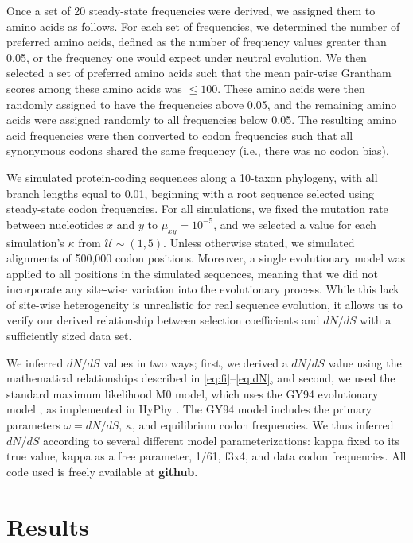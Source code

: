 \documentclass[11pt]{article}
\begin{document}
Once a set of 20 steady-state frequencies were derived, we assigned them to amino acids as follows. For each set of frequencies, we determined the number of preferred amino acids, defined as the number of frequency values greater than 0.05, or the frequency one would expect under neutral evolution.  We then selected a set of preferred amino acids such that the mean pair-wise Grantham scores among these amino acids was $\leq 100$. These amino acids were then randomly assigned to have the frequencies above 0.05, and the remaining amino acids were assigned randomly to all frequencies below 0.05. The resulting amino acid frequencies were then converted to codon frequencies such that all synonymous codons shared the same frequency (i.e., there was no codon bias).

We simulated protein-coding sequences along a 10-taxon phylogeny, with all branch lengths equal to 0.01, beginning with a root sequence selected using steady-state codon frequencies. For all simulations, we fixed the mutation rate between nucleotides $x$ and $y$ to $\mu_{xy} =10^{-5}$, and we selected a value for each simulation's $\kappa$ from $\mathcal{U} \sim (1, 5)$. Unless otherwise stated, we simulated alignments of 500,000 codon positions. Moreover, a single evolutionary model was applied to all positions in the simulated sequences, meaning that we did not incorporate any site-wise variation into the evolutionary process. While this lack of site-wise heterogeneity is unrealistic for real sequence evolution, it allows us to verify our derived relationship between selection coefficients and $dN/dS$ with a sufficiently sized data set.

We inferred $dN/dS$ values in two ways; first, we derived a $dN/dS$ value using the mathematical relationships described in \eqref{eq:fi}--\eqref{eq:dN}, and second, we used the standard maximum likelihood M0 model, which uses the GY94 evolutionary model \cite{GoldmanYang1994}, as implemented in HyPhy \cite{KosakovskyPondetal2005}. The GY94 model includes the primary parameters $\omega=dN/dS$, $\kappa$, and equilibrium codon frequencies. We thus inferred $dN/dS$ according to several different model parameterizations: kappa fixed to its true value, kappa as a free parameter, 1/61, f3x4, and data codon frequencies. All code used is freely available at \textbf{github}.


\section*{Results}
\end{document}
